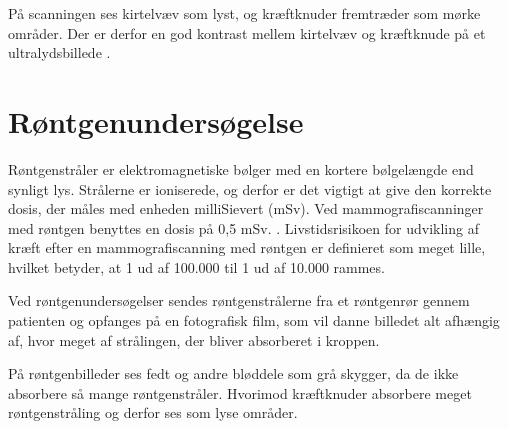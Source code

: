 På scanningen ses kirtelvæv som lyst, og kræftknuder fremtræder som mørke områder.  Der er derfor en god kontrast mellem kirtelvæv og kræftknude på et ultralydsbillede \citep{Ultralyd}.

\section{Røntgenundersøgelse}
Røntgenstråler er elektromagnetiske bølger med en kortere bølgelængde end synligt lys. Strålerne er ioniserede, og derfor er det vigtigt at give den korrekte dosis, der måles med enheden milliSievert (mSv). Ved mammografiscanninger med røntgen benyttes en dosis på 0,5 mSv. \cite{Sundhedsstyrelsen}. Livstidsrisikoen for udvikling af kræft efter en mammografiscanning med røntgen er definieret som meget lille, hvilket betyder, at 1 ud af 100.000 til 1 ud af 10.000 rammes. 

Ved røntgenundersøgelser sendes røntgenstrålerne fra et røntgenrør gennem patienten og opfanges på en fotografisk film, som vil danne billedet alt afhængig af, hvor meget af strålingen, der bliver absorberet i kroppen. 

På røntgenbilleder ses fedt og andre bløddele som grå skygger, da de ikke absorbere så mange røntgenstråler. Hvorimod kræftknuder absorbere meget røntgenstråling og derfor ses som lyse områder. \cite{Rontgenundersogelse}

